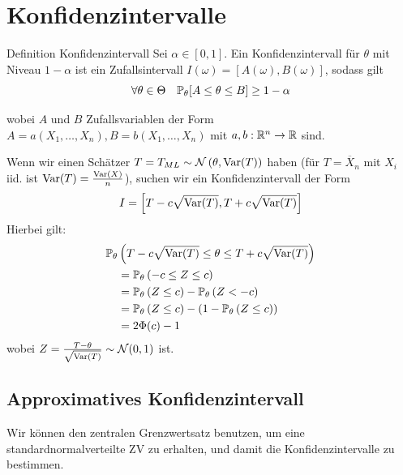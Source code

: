 \section{Konfidenzintervalle}
\begin{mainbox}{Definition Konfidenzintervall}
	Sei \(\alpha \in [0,1]\). Ein Konfidenzintervall für \(\theta\) mit Niveau \(1 - \alpha\) ist ein Zufallsintervall \(I(\omega)=[A(\omega),B(\omega)]\), sodass gilt
	\[\forall \theta \in \Theta \quad \P_\theta[A\le \theta \le B] \ge 1- \alpha\]

	wobei \(A\) und \(B\) Zufallsvariablen der Form \(A = a(X_1, \ldots, X_n), B = b(X_1, \ldots, X_n)\) mit \(a,b: \R^n \to \R\) sind.
\end{mainbox}

Wenn wir einen Schätzer \(T = T_{ML} \sim \mathcal{N}\left(\theta, \Var(T)\right)\) haben
(für \(T = \overline{X}_n\) mit \(X_i\) iid. ist \(\Var(T) = \frac{\Var(X)}{n}\)),
suchen wir ein Konfidenzintervall der Form
\[I = \left[T-c \sqrt{\Var(T)}, T+c\sqrt{\Var(T)}\right]\]
Hierbei gilt:
\begin{align*}
	\P_\theta&\left(T-c\sqrt{\Var(T)} \le \theta \le T+c\sqrt{\Var(T)}\right) \\
	&= \P_\theta\left(-c\le Z \le c\right)\\
	&= \P_{\theta}\left(Z \leq c\right) - \P_{\theta}\left(Z < -c\right)\\
	&= \P_{\theta}\left(Z \leq c\right) - \left(1-\P_{\theta}\left(Z \leq c\right)\right)\\
	&= 2\Phi(c)-1
\end{align*}
wobei \(Z = \frac{T-\theta}{\sqrt{\Var(T)}} \sim \mathcal{N}(0,1)\) ist.

\subsection{Approximatives Konfidenzintervall}
Wir können den zentralen Grenzwertsatz benutzen, um eine standardnormalverteilte ZV zu erhalten, und damit die Konfidenzintervalle zu bestimmen.


